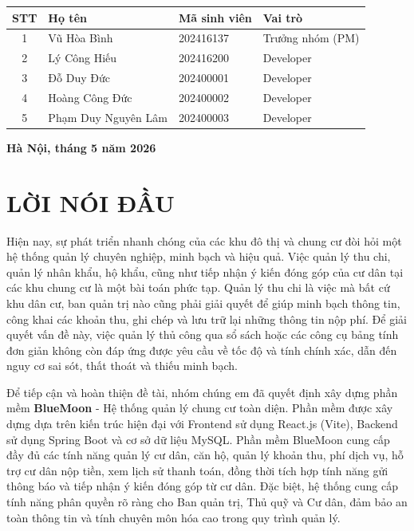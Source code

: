 \documentclass[12pt,a4paper]{article}
\begin{document}
\begin{titlepage}
\begin{center}
    \begin{tabular}{|c|l|l|l|}
        \hline
        \textbf{STT} & \textbf{Họ tên} & \textbf{Mã sinh viên} & \textbf{Vai trò} \\
        \hline
        1 & Vũ Hòa Bình & 202416137 & Trưởng nhóm (PM) \\
        \hline
        2 & Lý Công Hiếu & 202416200 & Developer \\
        \hline
        3 & Đỗ Duy Đức & 202400001 & Developer \\
        \hline
        4 & Hoàng Công Đức & 202400002 & Developer \\
        \hline
        5 & Phạm Duy Nguyên Lâm & 202400003 & Developer \\
        \hline
    \end{tabular}
    
    \vfill
    
    \textbf{Hà Nội, tháng 5 năm 2026}
\end{center}
\end{titlepage}

\newpage
{}
\setcounter{page}{2}

\section*{LỜI NÓI ĐẦU}

Hiện nay, sự phát triển nhanh chóng của các khu đô thị và chung cư đòi hỏi một hệ thống quản lý chuyên nghiệp, minh bạch và hiệu quả. Việc quản lý thu chi, quản lý nhân khẩu, hộ khẩu, cũng như tiếp nhận ý kiến đóng góp của cư dân tại các khu chung cư là một bài toán phức tạp. Quản lý thu chi là việc mà bất cứ khu dân cư, ban quản trị nào cũng phải giải quyết để giúp minh bạch thông tin, công khai các khoản thu, ghi chép và lưu trữ lại những thông tin nộp phí. Để giải quyết vấn đề này, việc quản lý thủ công qua sổ sách hoặc các công cụ bảng tính đơn giản không còn đáp ứng được yêu cầu về tốc độ và tính chính xác, dẫn đến nguy cơ sai sót, thất thoát và thiếu minh bạch.

Để tiếp cận và hoàn thiện đề tài, nhóm chúng em đã quyết định xây dựng phần mềm \textbf{BlueMoon} - Hệ thống quản lý chung cư toàn diện. Phần mềm được xây dựng dựa trên kiến trúc hiện đại với Frontend sử dụng React.js (Vite), Backend sử dụng Spring Boot và cơ sở dữ liệu MySQL. Phần mềm BlueMoon cung cấp đầy đủ các tính năng quản lý cư dân, căn hộ, quản lý khoản thu, phí dịch vụ, hỗ trợ cư dân nộp tiền, xem lịch sử thanh toán, đồng thời tích hợp tính năng gửi thông báo và tiếp nhận ý kiến đóng góp từ cư dân. Đặc biệt, hệ thống cung cấp tính năng phân quyền rõ ràng cho Ban quản trị, Thủ quỹ và Cư dân, đảm bảo an toàn thông tin và tính chuyên môn hóa cao trong quy trình quản lý.
\end{document}
